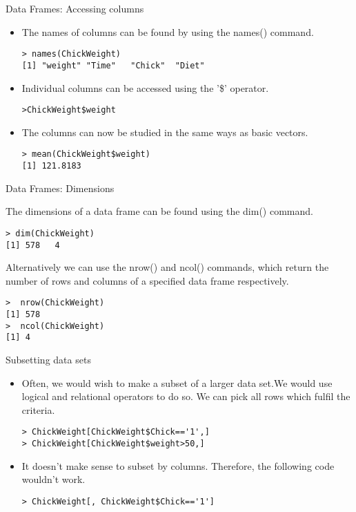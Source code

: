 \documentclass[pdf,default,slideColor,colorBG]{prosper}
\begin{document}
\begin{slide}{Data Frames: Accessing columns}
\begin{itemize}
\item The names of columns can be found by using the names()
command.
\begin{verbatim}
> names(ChickWeight)
[1] "weight" "Time"   "Chick"  "Diet"
\end{verbatim}

\item Individual columns can be accessed using the '\$' operator.
\begin{verbatim}
>ChickWeight$weight
\end{verbatim}


\item The columns can now be studied in the same ways as basic
vectors.
\begin{verbatim}
> mean(ChickWeight$weight)
[1] 121.8183
\end{verbatim}
\end{itemize}
\end{slide}
\begin{slide}{Data Frames: Dimensions}

The dimensions of a data frame can be found using the dim()
command.
\begin{verbatim}
> dim(ChickWeight)
[1] 578   4
\end{verbatim}
Alternatively we can use the nrow() and ncol() commands, which
return the number of rows and columns of a specified data frame
respectively.
\begin{verbatim}
>  nrow(ChickWeight)
[1] 578
>  ncol(ChickWeight)
[1] 4
\end{verbatim}
\end{slide}
\begin{slide}{Subsetting data sets}
\begin{itemize}
\item Often, we would wish to make a subset of a larger data
set.We would use logical and relational operators to do so. We can
pick all rows which fulfil the criteria.


\begin{verbatim}
> ChickWeight[ChickWeight$Chick=='1',]
> ChickWeight[ChickWeight$weight>50,]
\end{verbatim}
\item It doesn't make sense to subset by columns. Therefore, the
following code wouldn't work.

\begin{verbatim}
> ChickWeight[, ChickWeight$Chick=='1']
\end{verbatim}
\end{itemize}
\end{slide}
\end{document}

